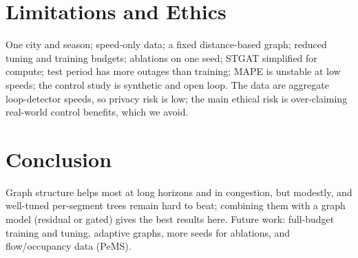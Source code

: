 \documentclass[conference]{IEEEtran}
\begin{document}
\section{Limitations and Ethics}
One city and season; speed-only data; a fixed distance-based graph; reduced tuning and training budgets; ablations on one seed; STGAT simplified for compute; test period has more outages than training; MAPE is unstable at low speeds; the control study is synthetic and open loop.
The data are aggregate loop-detector speeds, so privacy risk is low; the main ethical risk is over-claiming real-world control benefits, which we avoid.

\section{Conclusion}
Graph structure helps most at long horizons and in congestion, but modestly, and well-tuned per-segment trees remain hard to beat; combining them with a graph model (residual or gated) gives the best results here.
Future work: full-budget training and tuning, adaptive graphs, more seeds for ablations, and flow/occupancy data (PeMS).



\end{document}
